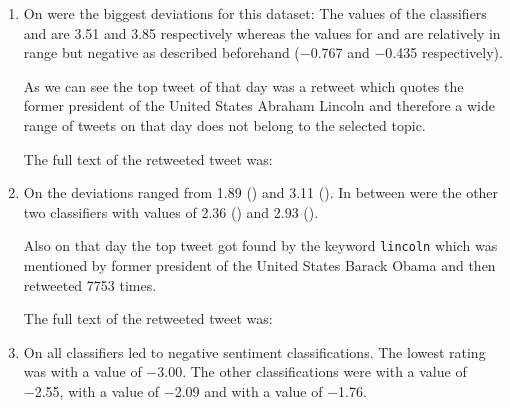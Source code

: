 \begin{enumerate}
    \item 
        On  were the biggest deviations for this dataset:
        The values of the classifiers \ftb{} and \fme{} are \num{3.51} and \num{3.85} respectively whereas the values for \fnb{} and \fsvm{} are relatively in range but negative as described beforehand (\num{-0.767} and \num{-0.435} respectively).

        
        As we can see the top tweet of that day was a retweet which quotes the former president of the United States Abraham Lincoln and therefore a wide range of tweets on that day does not belong to the selected topic.

        The full text of the retweeted tweet was:

    \item 
        On  the deviations ranged from \num{1.89} (\ftb{}) and \num{3.11} (\fnb{}).
        In between were the other two classifiers with values of \num{2.36} (\fme{}) and \num{2.93} (\fsvm{}).


        Also on that day the top tweet got found by the keyword \texttt{lincoln} which was mentioned by former president of the United States Barack Obama and then retweeted \num{7753} times.

        The full text of the retweeted tweet was:

    \item 
        On  all classifiers led to negative sentiment classifications.
        The lowest rating was \fnb{} with a value of \num{-3.00}.
        The other classifications were \fsvm{} with a value of \num{-2.55}, \fme{} with a value of \num{-2.09} and \ftb{} with a value of \num{-1.76}.



\end{enumerate}
